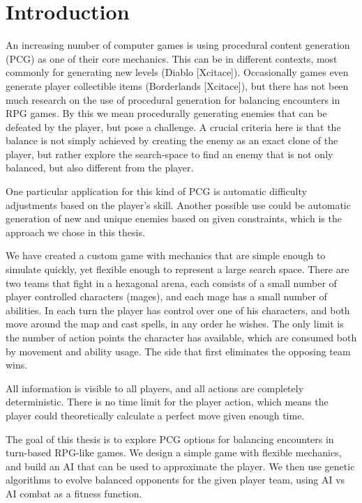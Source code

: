 \chapter*{Introduction}

An increasing number of computer games is using procedural content generation (PCG) as one of their core mechanics. This can be in different contexts, most commonly for generating new levels (Diablo [Xcitace]). Occasionally games even generate player collectible items (Borderlands [Xcitace]), but there has not been much research on the use of procedural generation for balancing encounters in RPG games. By this we mean procedurally generating enemies that can be defeated by the player, but pose a challenge. A crucial criteria here is that the balance is not simply achieved by creating the enemy as an exact clone of the player, but rather explore the search-space to find an enemy that is not only balanced, but also different from the player.

One particular application for this kind of PCG is automatic difficulty adjustments based on the player's skill. Another possible use could be automatic generation of new and unique enemies based on given constraints, which is the approach we chose in this thesis.

We have created a custom game with mechanics that are simple enough to simulate quickly, yet flexible enough to represent a large search space. There are two teams that fight in a hexagonal arena, each consists of a small number of player controlled characters (mages), and each mage has a small number of abilities. In each turn the player has control over one of his characters, and both move around the map and cast spells, in any order he wishes. The only limit is the number of action points the character has available, which are consumed both by movement and ability usage. The side that first eliminates the opposing team wins.

All information is visible to all players, and all actions are completely deterministic. There is no time limit for the player action, which means the player could theoretically calculate a perfect move given enough time.

The goal of this thesis is to explore PCG options for balancing encounters in turn-based RPG-like games. We design a simple game with flexible mechanics, and build an AI that can be used to approximate the player. We then use genetic algorithms to evolve balanced opponents for the given player team, using AI vs AI combat as a fitness function.

